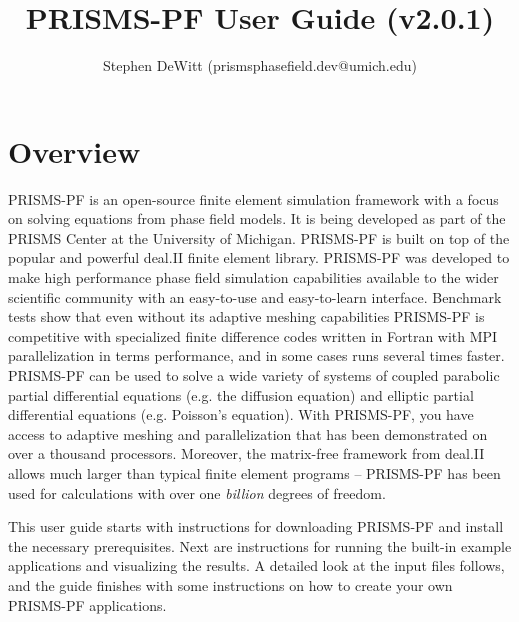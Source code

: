 \documentclass[10pt]{article} %
\title{PRISMS-PF User Guide (v2.0.1)}
\author{Stephen DeWitt (prismsphasefield.dev@umich.edu)}
\begin{document}
\posttitle{\end{center}}

\begin{titlingpage}
\maketitle
\end{titlingpage}
\tableofcontents

\clearpage

\section{Overview}
PRISMS-PF is an open-source finite element simulation framework with a focus on solving equations from phase field models. It is being developed as part of the PRISMS Center at the University of Michigan. PRISMS-PF is built on top of the popular and powerful deal.II finite element library. PRISMS-PF was developed to make high performance phase field simulation capabilities available to the wider scientific community with an easy-to-use and easy-to-learn interface. Benchmark tests show that even without its adaptive meshing capabilities PRISMS-PF is competitive with specialized finite difference codes written in Fortran with MPI parallelization in terms performance,  and in some cases runs several times faster. PRISMS-PF can be used to solve a wide variety of systems of coupled parabolic partial differential equations (e.g. the diffusion equation) and elliptic partial differential equations (e.g. Poisson's equation). With PRISMS-PF, you have access to adaptive meshing and parallelization that has been demonstrated on over a thousand processors. Moreover, the matrix-free framework from deal.II allows much larger than typical finite element programs -- PRISMS-PF has been used for calculations with over one \emph{billion} degrees of freedom.

This user guide starts with instructions for downloading PRISMS-PF and install the necessary prerequisites. Next are instructions for running the built-in example applications and visualizing the results. A detailed look at the input files follows, and the guide finishes with some instructions on how to create your own PRISMS-PF applications.
\end{document}
